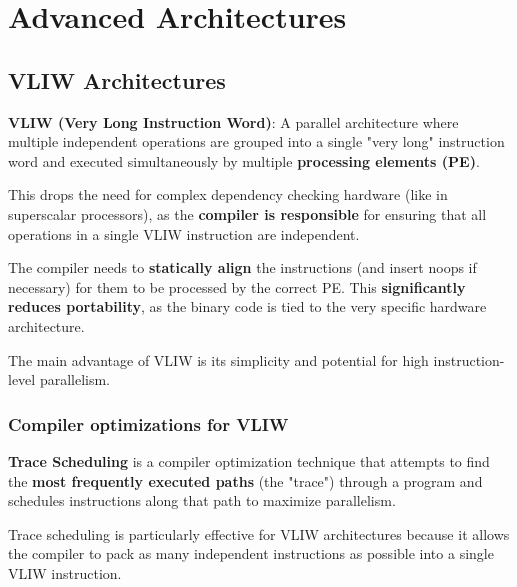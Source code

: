 \section{Advanced Architectures}

\subsection{VLIW Architectures}

\begin{definition}
    \textbf{VLIW (Very Long Instruction Word)}: A parallel architecture where multiple independent operations are grouped into a single "very long" instruction word and executed simultaneously by multiple \textbf{processing elements (PE)}.
\end{definition}

\begin{remark}
    This drops the need for complex dependency checking hardware (like in superscalar processors), as the \textbf{compiler is responsible} for ensuring that all operations in a single VLIW instruction are independent.
\end{remark}

\begin{important}
    The compiler needs to \textbf{statically align} the instructions (and insert noops if necessary) for them to be processed by the correct PE. This \textbf{significantly reduces portability}, as the binary code is tied to the very specific hardware architecture.
\end{important}

\begin{remark}
    The main advantage of VLIW is its simplicity and potential for high instruction-level parallelism.
\end{remark}

\subsubsection{Compiler optimizations for VLIW}

\begin{definition}
    \textbf{Trace Scheduling} is a compiler optimization technique that attempts to find the \textbf{most frequently executed paths} (the "trace") through a program and schedules instructions along that path to maximize parallelism.
\end{definition}

\begin{remark}
    Trace scheduling is particularly effective for VLIW architectures because it allows the compiler to pack as many independent instructions as possible into a single VLIW instruction.
\end{remark}

